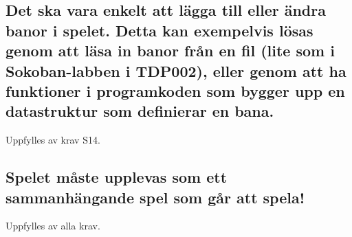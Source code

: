 \documentclass{TDP005mall}
\begin{document}
\subsection{Det ska vara enkelt att lägga till eller ändra banor i spelet. Detta kan exempelvis lösas genom att läsa in banor från en fil (lite som i Sokoban-labben i TDP002), eller genom att ha funktioner i programkoden som bygger upp en datastruktur som definierar en bana.}
Uppfylles av krav S14.
\subsection{Spelet måste upplevas som ett sammanhängande spel som går att spela!}
Uppfylles av alla krav.
\end{document}
